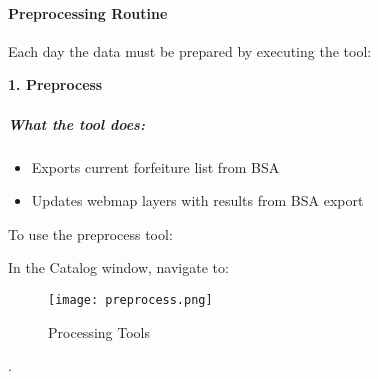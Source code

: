  \vspace{6.5in}

 \clearpage
\paragraph{Preprocessing Routine}

\vspace{.4in}

Each day the data must be prepared by executing the tool:
\vspace{.2in}

\textbf{1. Preprocess}

\vspace{.2in}

 \subparagraph*{What the tool does:}
 \vspace{.15in}

 \begin{itemize}
 \item Exports current forfeiture list from BSA
 \item Updates webmap layers with results from BSA export
 \end{itemize}
 To use the preprocess tool:
\vspace{.15in}

\noindent In the Catalog window, navigate to:

\noindent \textcolor{HyperlinkBlue1}{\scriptsize{}}
 \begin{wrapfigure}{r}{0.5\textwidth}
 \centering
     \texttt{[image: preprocess.png]}
 \vspace{-.1in}

 \caption{Processing Tools}
 \end{wrapfigure}
 .
 \vspace{2in}

 \vspace{.5in}

